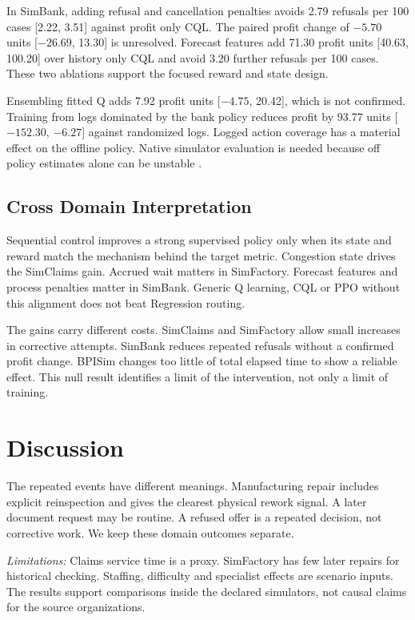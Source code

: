 \documentclass[conference]{IEEEtran}
\begin{document}
In SimBank, adding refusal and cancellation penalties avoids 2.79 refusals per 100 cases [2.22, 3.51] against profit only CQL. The paired profit change of $-5.70$ units [$-26.69$, 13.30] is unresolved. Forecast features add 71.30 profit units [40.63, 100.20] over history only CQL and avoid 3.20 further refusals per 100 cases. These two ablations support the focused reward and state design.

Ensembling fitted Q adds 7.92 profit units [$-4.75$, 20.42], which is not confirmed. Training from logs dominated by the bank policy reduces profit by 93.77 units [$-152.30$, $-6.27$] against randomized logs. Logged action coverage has a material effect on the offline policy. Native simulator evaluation is needed because off policy estimates alone can be unstable \cite{ope}.

\subsection{Cross Domain Interpretation}

Sequential control improves a strong supervised policy only when its state and reward match the mechanism behind the target metric. Congestion state drives the SimClaims gain. Accrued wait matters in SimFactory. Forecast features and process penalties matter in SimBank. Generic Q learning, CQL or PPO without this alignment does not beat Regression routing.

The gains carry different costs. SimClaims and SimFactory allow small increases in corrective attempts. SimBank reduces repeated refusals without a confirmed profit change. BPISim changes too little of total elapsed time to show a reliable effect. This null result identifies a limit of the intervention, not only a limit of training.

\clearpage

\FloatBarrier

\section{Discussion}
\label{sec:discussion}

The repeated events have different meanings. Manufacturing repair includes explicit reinspection and gives the clearest physical rework signal. A later document request may be routine. A refused offer is a repeated decision, not corrective work. We keep these domain outcomes separate.

\textit{Limitations:} Claims service time is a proxy. SimFactory has few later repairs for historical checking. Staffing, difficulty and specialist effects are scenario inputs. The results support comparisons inside the declared simulators, not causal claims for the source organizations.
\end{document}
